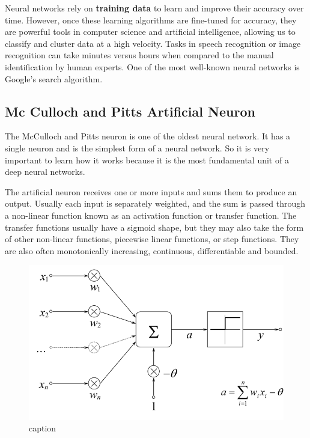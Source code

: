 \documentclass[11pt]{article}
\begin{document}
    Neural networks rely on \textbf{training data} to learn and improve
their accuracy over time. However, once these learning algorithms are
fine-tuned for accuracy, they are powerful tools in computer science and
artificial intelligence, allowing us to classify and cluster data at a
high velocity. Tasks in speech recognition or image recognition can take
minutes versus hours when compared to the manual identification by human
experts. One of the most well-known neural networks is Google's search
algorithm.

    \hypertarget{mc-culloch-and-pitts-artificial-neuron}{%
\subsection{Mc Culloch and Pitts Artificial
Neuron}\label{mc-culloch-and-pitts-artificial-neuron}}

    The McCulloch and Pitts neuron is one of the oldest neural network. It
has a single neuron and is the simplest form of a neural network. So it
is very important to learn how it works because it is the most
fundamental unit of a deep neural networks.

The artificial neuron receives one or more inputs and sums them to
produce an output. Usually each input is separately weighted, and the
sum is passed through a non-linear function known as an activation
function or transfer function. The transfer functions usually have a
sigmoid shape, but they may also take the form of other non-linear
functions, piecewise linear functions, or step functions. They are also
often monotonically increasing, continuous, differentiable and bounded.

    \begin{figure}
\centering
\includegraphics{./pic/chapter-5-1_pic_1.png}
\caption{caption}
\end{figure}
\end{document}
